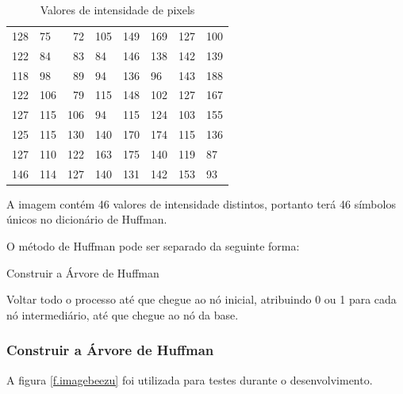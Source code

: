 \begin{table}[]
    \begin{center}
        \caption{\small Valores de intensidade de pixels}
        \label{t.imagecompressionbasics}
        \begin{tabular}{llrlllll}
            128 & 75  & 72  & 105 & 149 & 169 & 127 & 100 \\
            122 & 84  & 83  & 84  & 146 & 138 & 142 & 139 \\
            118 & 98  & 89  & 94  & 136 & 96  & 143 & 188 \\
            122 & 106 & 79  & 115 & 148 & 102 & 127 & 167 \\
            127 & 115 & 106 & 94  & 115 & 124 & 103 & 155 \\
            125 & 115 & 130 & 140 & 170 & 174 & 115 & 136 \\
            127 & 110 & 122 & 163 & 175 & 140 & 119 & 87  \\
            146 & 114 & 127 & 140 & 131 & 142 & 153 & 93
        \end{tabular}
    \end{center}
\end{table}

A imagem contém 46 valores de intensidade distintos, portanto terá 46 símbolos únicos no dicionário de Huffman.

O método de Huffman pode ser separado da seguinte forma:

\begin{alineas}
    \item Construir a Árvore de Huffman
    \item Voltar todo o processo até que chegue ao nó inicial, atribuindo 0 ou 1 para cada nó intermediário, até que chegue ao nó da base.
\end{alineas}

\subsubsection{Construir a Árvore de Huffman}
\label{sss.huffmantree}

A figura \ref{f.imagebeezu} foi utilizada para testes durante o desenvolvimento.

